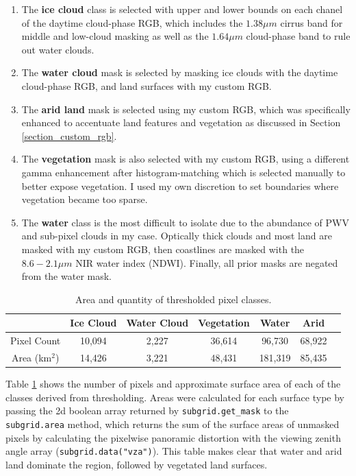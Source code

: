 \documentclass[12pt]{article}
\begin{document}
\begin{enumerate}
    \item{The \textbf{ice cloud} class is selected with upper and lower bounds on each chanel of the daytime cloud-phase RGB, which includes the $1.38\mu m$ cirrus band for middle and low-cloud masking as well as the $1.64\mu m$ cloud-phase band to rule out water clouds.}
    \item{The \textbf{water cloud} mask is selected by masking ice clouds with the daytime cloud-phase RGB, and land surfaces with my custom RGB.}
    \item{The \textbf{arid land} mask is selected using my custom RGB, which was specifically enhanced to accentuate land features and vegetation as discussed in Section \ref{section_custom_rgb}.}
    \item{The \textbf{vegetation} mask is also selected with my custom RGB, using a different gamma enhancement after histogram-matching which is selected manually to better expose vegetation. I used my own discretion to set boundaries where vegetation became too sparse.}
    \item{The \textbf{water} class is the most difficult to isolate due to the abundance of PWV and sub-pixel clouds in my case. Optically thick clouds and most land are masked with my custom RGB, then coastlines are masked with the $8.6-2.1\mu m$ NIR water index (NDWI). Finally, all prior masks are negated from the water mask.}
\end{enumerate}

\begin{table}[h!]
    \centering
    \begin{tabular}{c|cccccc}
        & Ice Cloud & Water Cloud & Vegetation & Water & Arid \\
        \hline
        Pixel Count & 10,094 & 2,227 & 36,614 & 96,730 & 68,922\\
        Area (km$^2$)& 14,426 & 3,221 & 48,431 & 181,319 & 85,435\\
    \end{tabular}
    \caption{Area and quantity of thresholded pixel classes.}
    \label{thresh_areas}
\end{table}

Table \ref{thresh_areas} shows the number of pixels and approximate surface area of each of the classes derived from thresholding. Areas were calculated for each surface type by passing the 2d boolean array returned by \texttt{subgrid.get\_mask} to the \texttt{subgrid.area} method, which returns the sum of the surface areas of unmasked pixels by calculating the pixelwise panoramic distortion with the viewing zenith angle array (\texttt{subgrid.data("vza")}). This table makes clear that water and arid land dominate the region, followed by vegetated land surfaces.
\end{document}
